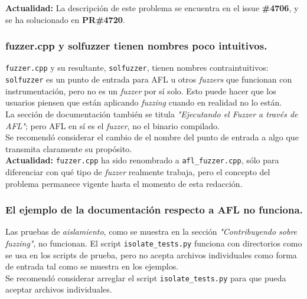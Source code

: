 \textbf{Actualidad:} La descripción de este problema se encuentra en el issue \textbf{\#4706}\cite{GHI4706}, y se ha solucionado en \textbf{PR\#4720}\cite{GHPR4720}.\\


\subsubsection{fuzzer.cpp y solfuzzer tienen nombres poco intuitivos.}

\texttt{fuzzer.cpp} y su resultante, \texttt{solfuzzer}, tienen nombres contraintuitivos: \texttt{solfuzzer} es un punto de entrada para AFL u otros \textit{fuzzers} que funcionan con instrumentación, pero no es un \textit{fuzzer} por sí solo. Esto puede hacer que los usuarios piensen que están aplicando \textit{fuzzing} cuando en realidad no lo están.\\

La sección de documentación también se titula \textit{"Ejecutando el Fuzzer a través de AFL"}\cite{ReadTheDocsSolidityAFL}; pero AFL en sí es el \textit{fuzzer}, no el binario compilado.\\

Se recomendó considerar el cambio de el nombre del punto de entrada a algo que transmita claramente su propósito.\\

\textbf{Actualidad:} \texttt{fuzzer.cpp} ha sido renombrado a \texttt{afl\_fuzzer.cpp}, sólo para diferenciar con qué tipo de \textit{fuzzer} realmente trabaja, pero el concepto del problema permanece vigente hasta el momento de esta redacción.\\


\subsubsection{El ejemplo de la documentación respecto a AFL no funciona.}

Las pruebas de \textit{aislamiento}, como se muestra en la sección \textit{"Contribuyendo sobre fuzzing"}\cite{ReadTheDocsSolidityContributingFuzzing}, no funcionan. El script \texttt{isolate\_tests.py}\cite{GHisolatetests} funciona con directorios como se usa en los scripts de prueba, pero no acepta archivos individuales como forma de entrada tal como se muestra en los ejemplos.\\

Se recomendó considerar arreglar el script \texttt{isolate\_tests.py} para que pueda aceptar archivos individuales.\\

